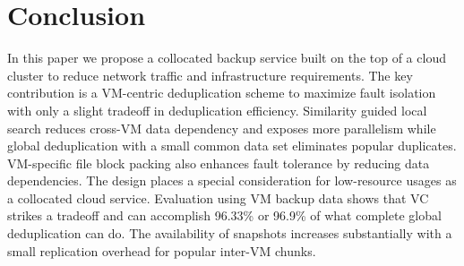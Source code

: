 \section{Conclusion}
\label{sect:conclusion}
In this paper we propose a collocated backup service built on
the top of a cloud cluster to reduce network traffic and infrastructure requirements.
The key contribution is a VM-centric deduplication scheme to 
maximize fault isolation with only a slight tradeoff in deduplication efficiency.
Similarity guided local search reduces cross-VM data dependency and exposes more parallelism  
while global deduplication with a small common data set eliminates popular duplicates.
VM-specific file block packing also enhances fault tolerance by reducing data dependencies.
The design places a special consideration for low-resource usages as a collocated cloud service.
Evaluation using  VM backup data shows that VC strikes a tradeoff and 
can accomplish 96.33\% or 96.9\% of what complete global
deduplication can do.  The availability of snapshots increases substantially with 
a small replication overhead for popular inter-VM chunks.

